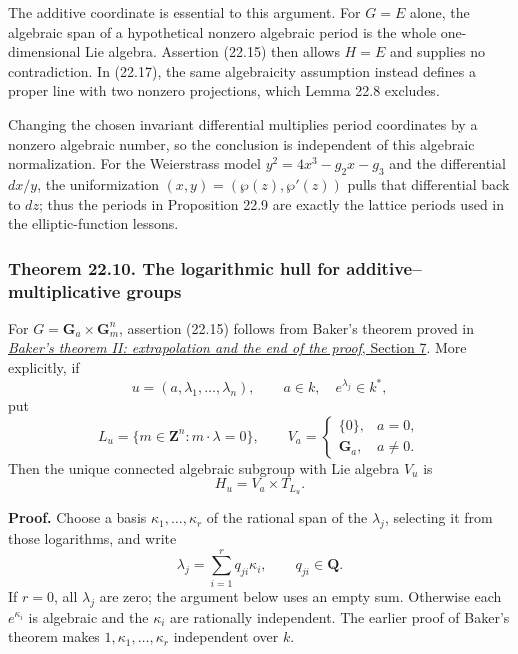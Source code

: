 \documentclass[
  11pt,
  a4paper,
]{article}
\begin{document}
The additive coordinate is essential to this argument. For \(G=E\)
alone, the algebraic span of a hypothetical nonzero algebraic period is
the whole one-dimensional Lie algebra. Assertion (22.15) then allows
\(H=E\) and supplies no contradiction. In (22.17), the same algebraicity
assumption instead defines a proper line with two nonzero projections,
which Lemma 22.8 excludes.

Changing the chosen invariant differential multiplies period coordinates
by a nonzero algebraic number, so the conclusion is independent of this
algebraic normalization. For the Weierstrass model \(y^2=4x^3-g_2x-g_3\)
and the differential \(dx/y\), the uniformization
\((x,y)=(\wp(z),\wp'(z))\) pulls that differential back to \(dz\); thus
the periods in Proposition 22.9 are exactly the lattice periods used in
the elliptic-function lessons.

\subsubsection{Theorem 22.10. The logarithmic hull for
additive--multiplicative
groups}\label{theorem-22.10.-the-logarithmic-hull-for-additivemultiplicative-groups}

For \(G=\mathbf G_a\times\mathbf G_m^n\), assertion (22.15) follows from
Baker's theorem proved in
\href{https://kokunoyumeto.github.io/open-math-courses-public/courses/TR-BAKER/TR-BAKER-03.html\#7-recover-the-integer-and-conclude}{\emph{Baker's
theorem II: extrapolation and the end of the proof}, Section 7}. More
explicitly, if \[
 u=(a,\lambda_1,\ldots,\lambda_n),\qquad
 a\in k,\quad e^{\lambda_j}\in k^*,
\] put \[
 L_u=\{m\in\mathbf Z^n:m\cdot\lambda=0\},\qquad
 V_a=\begin{cases}\{0\},&a=0,\\\mathbf G_a,&a\ne0.\end{cases}
 \tag{22.18}
\] Then the unique connected algebraic subgroup with Lie algebra \(V_u\)
is \[
 H_u=V_a\times T_{L_u}.
 \tag{22.19}
\]

\textbf{Proof.} Choose a basis \(\kappa_1,\ldots,\kappa_r\) of the
rational span of the \(\lambda_j\), selecting it from those logarithms,
and write \[
 \lambda_j=\sum_{i=1}^r q_{ji}\kappa_i,\qquad q_{ji}\in\mathbf Q.
\] If \(r=0\), all \(\lambda_j\) are zero; the argument below uses an
empty sum. Otherwise each \(e^{\kappa_i}\) is algebraic and the
\(\kappa_i\) are rationally independent. The earlier proof of Baker's
theorem makes \(1,\kappa_1,\ldots,\kappa_r\) independent over \(k\).
\end{document}
